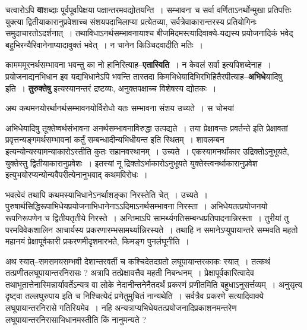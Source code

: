 \documentclass[article,12pt,a4paper]{memoir}
\begin{document}
	  \pstart चत्वारोऽपि \textbf{वा}शब्दाः पूर्वपूर्वापेक्षया पक्षान्तरमवद्योतयन्ति । सम्भावना च सर्वा वर्णिताऽनर्थोन्मुखा प्रतिपत्तिः युक्त्या द्वितीयाकारानुप्रवेशाच्च संशयपदाभिलाप्या प्रत्येतव्या, सर्वत्रेवाकारान्तरस्य प्रतियोगिनः समुदाचारतोऽदर्शनात् । तथाविधाऽनर्थसम्भावनायाश्च बीजमिदमस्त्यादिवाक्ये-यद्यस्य प्रयोजनादिकं भवेद् बहुभिरन्यैरिवानेनाप्यादावुक्तं भवेत् । न चानेन किञ्चिदवादीति मतिः ।
	\pend
      

	  \pstart कामममूरनर्थसम्भावना भवन्तु का नो हानिरित्याह--\textbf{एतास्विति} । न केवलं सर्वा इत्यपिशब्देनाह । प्रयोजनाद्यनभिधान इव यद्यभिधानेऽपि भवन्ति तास्तदा किमभिधेयादिभिरभिहितैरपीत्याह--\textbf{अभिधे}यादिषु इति । \textbf{तुरुक्तेषु} इत्यस्यानन्तरं द्रष्टव्यः, अनुक्तपक्षाच्च विशेषस्य द्योतकः ।
	\pend
      

	  \pstart अथ कथमनयोरर्थानर्थसम्भावनयोर्विरोधो यतः सम्भावना संशय उच्यते । स चोभयां \leavevmode{} 
	  
	अभिधेयादिषु तूक्तेष्वर्थसंभावना अनर्थसम्भावनाविरुद्धा उत्पद्यते । तया प्रेक्षावन्तः प्रवर्तन्ते इति प्रेक्षावतां प्रवृत्तन्यङ्गमर्थसम्भावनां कर्तुं सम्बन्धादीन्यभिधीयन्त इति स्थितम् । शावलम्बन इत्यन्योन्यस्यामन्याकारोऽस्तीति कुतः सहानवस्थानम् । उच्यते । एकस्यामनर्थांकार उद्रिक्तोऽनुभूयते, युक्तेस्तु द्वितीयाकारानुप्रवेशः । इतस्यां नू  द्रिक्तोऽ\leavevmode{}र्भाकारोऽनुभूयते युक्तेस्त्वनर्थाकारानुप्रवेश इत्युभयोरप्यन्योन्यवैपरीत्येनानुभवाद् कथमविरोधः ।
	\pend
      

	  \pstart भवत्वेवं तथापि कथमस्याभिधानेऽनर्थाशङ्का निरस्तेति चेत् । उच्यते । पुरुषार्थसिद्धिरूपाभिधेयप्रयोजनाभिधानेनाऽऽदिमाऽनर्थसम्भावना निरस्ता । अभिधेयतत्प्रयोजनयो रूपनिरूपणेन च द्वितीयतृतीये निरस्ते । अन्तिमाऽपि सामर्थ्यगतिसम्बन्धप्रतिपादनान्निरस्ता । तुरीयां तु परमविवेकशालिन आचार्यस्य प्रकरणारम्भसामर्थ्यान्निरस्यते । तथाहि न समानेऽप्युपायान्तरे सम्भवति महतो महानयं प्रेक्षापूर्वकारी प्रकरणमीदृशमारभते, किमङ्ग पुनर्लघूनीति ।
	\pend
      

	  \pstart अथ स्यात्--समसमयसम्भवी देशान्तरवर्ती च कश्चिदेतदग्रतो लघूपायान्तरकाकः  स्यात् । तत्कथं तत्प्रणीतलघूपायान्तरनिरासः ? अत्रापि तत्प्रेक्षावत्तैव महती निबन्धनम् । प्रेक्षापूर्वकारित्वादेव तथाभूतात्तेनास्मिन्नार्यावर्तेऽन्यत्र वा लोके नेदानीन्तनेनैतदर्थं प्रकरणं प्रणीतमिति बहुधाऽनुसर्त्तव्यम् । अनुसृत्य दृष्ट्वा तल्लघुरुपाय इति च निश्चित्येदं प्रणेतुमुचितं नान्यथेति । सर्वत्रैव प्रकरणे सत्यादिवाक्ये लघूपायान्तरनिरासे गतिरियमेव । नहि अन्यत्राप्यभिधेयतत्प्रयोजनादिप्रकाशनमन्तरेण लघूपायान्तरनिरासाभिधानमस्तीति किं नानुमन्यते ?
	\pend
      
\end{document}
